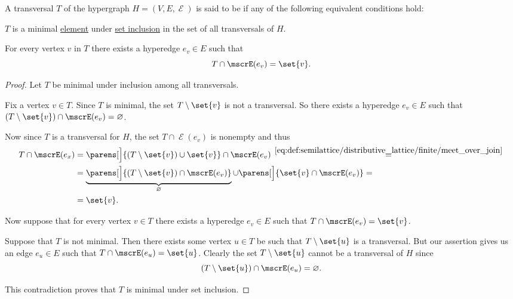 \begin{definition}\label{def:hypergraph_minimal_transversal}
  A transversal \( T \) of the hypergraph \( H = (V, E, \mscrE) \) is said to be  if any of the following equivalent conditions hold:
  \begin{thmenum}
     \( T \) is a minimal \hyperref[def:partially_ordered_set_extremal_points/maximal_and_minimal_element]{element} under \hyperref[def:subset]{set inclusion} in the set of all transversals of \( H \).

     For every vertex \( v \) in \( T \) there exists a hyperedge \( e_v \in E \) such that
    \begin{equation*}
      T \cap \mscrE(e_v) = \set{ v }.
    \end{equation*}
  \end{thmenum}
\end{definition}
\begin{proof}
   Let \( T \) be minimal under inclusion among all transversals.

  Fix a vertex \( v \in T \). Since \( T \) is minimal, the set \( T \setminus \set{ v } \) is not a transversal. So there exists a hyperedge \( e_v \in E \) such that \( (T \setminus \set{ v }) \cap \mscrE(e_v) = \varnothing \).

  Now since \( T \) is a transversal for \( H \), the set \( T \cap \mscrE(e_v) \) is nonempty and thus
  \begin{align*}
    T \cap \mscrE(e_x)
    &=
    \parens[\Big]{ (T \setminus \set{ v }) \cup \set{ v } } \cap \mscrE(e_v)
    \reloset {\eqref{eq:def:semilattice/distributive_lattice/finite/meet_over_join}} = \\ &=
    \underbrace{\parens[\Big]{ (T \setminus \set{ v }) \cap \mscrE(e_v) }}_{\varnothing} \cup \parens[\Big]{ \set{ v } \cap \mscrE(e_v) }
    = \\ &=
    \set{ v }.
  \end{align*}

   Now suppose that for every vertex \( v \in T \) there exists a hyperedge \( e_v \in E \) such that \( T \cap \mscrE(e_v) = \set{ v } \).

  Suppose that \( T \) is not minimal. Then there exists some vertex \( u \in T \) be such that \( T \setminus \set{ u } \) is a transversal. But our assertion gives us an edge \( e_u \in E \) such that \( T \cap \mscrE(e_u) = \set{ u } \). Clearly the set \( T \setminus \set{ u } \) cannot be a transversal of \( H \) since
  \begin{equation*}
    (T \setminus \set{ u }) \cap \mscrE(e_u) = \varnothing.
  \end{equation*}

  This contradiction proves that \( T \) is minimal under set inclusion.
\end{proof}


